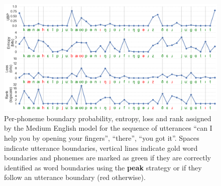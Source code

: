 
\begin{figure}
    \centering
    \includegraphics[width=\linewidth]{Figures/15Phonology/qualitative.png}
    \caption{Per-phoneme boundary probability, entropy, loss and rank assigned by the Medium English model for the sequence of utterances ``can I help you by opening your fingers'', ``there'', ``you got it''. Spaces indicate utterance boundaries, vertical lines indicate gold word boundaries and phonemes are marked as green if they are correctly identified as word boundaries using the \textbf{peak} strategy or if they follow an utterance boundary (red otherwise).}
    \label{fig:15-qualitative}
\end{figure}



